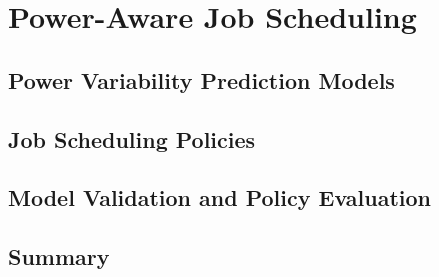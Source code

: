 
\chapter{Power-Aware Job Scheduling}
\label{chap:power_aware_job_scheduling}



\section{Power Variability Prediction Models}
\label{sec:variability_prediction}

\section{Job Scheduling Policies}
\label{sec:job_sched_policies}

\section{Model Validation and Policy Evaluation}


\section{Summary}

